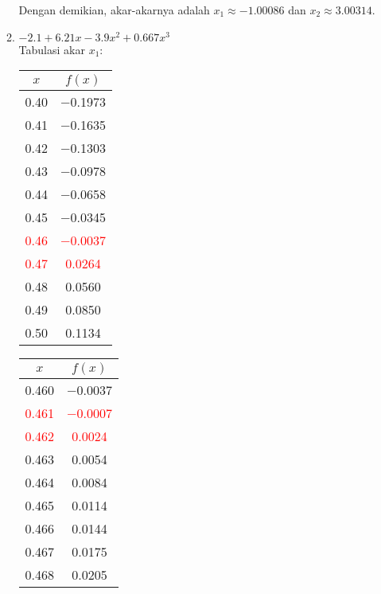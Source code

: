 \documentclass{article}
\begin{document}
\begin{enumerate}
\begin{enumerate}
            Dengan demikian, akar-akarnya adalah $x_1 \approx \num{-1,00086}$ dan $x_2 \approx \num{3,00314}$.
    
        \item $\num{-2,1} + \num{6,21}x - \num{3,9}x^2 + \num{0,667}x^3$ \\
        Tabulasi akar $x_1$: \\
        \begin{tabular}{|c|c|}
            \hline
            $x$   & $f(x)$ \\
            \hline
            \num{0,40} & \num{-0,1973} \\
            \num{0,41} & \num{-0,1635} \\
            \num{0,42} & \num{-0,1303} \\
            \num{0,43} & \num{-0,0978} \\
            \num{0,44} & \num{-0,0658} \\
            \num{0,45} & \num{-0,0345} \\
            \textcolor{red}{\num{0,46}} & \textcolor{red}{\num{-0,0037}} \\
            \textcolor{red}{\num{0,47}} & \textcolor{red}{\num{0,0264}} \\
            \num{0,48} & \num{0,0560} \\
            \num{0,49} & \num{0,0850} \\
            \num{0,50} & \num{0,1134} \\
            \hline
            \end{tabular}\quad
            \begin{tabular}{|c|c|}
            \hline
            $x$   & $f(x)$ \\
            \hline
            \num{0,460} & \num{-0,0037} \\
            \textcolor{red}{\num{0,461}} & \textcolor{red}{\num{-0,0007}} \\
            \textcolor{red}{\num{0,462}} & \textcolor{red}{\num{0,0024}} \\
            \num{0,463} & \num{0,0054} \\
            \num{0,464} & \num{0,0084} \\
            \num{0,465} & \num{0,0114} \\
            \num{0,466} & \num{0,0144} \\
            \num{0,467} & \num{0,0175} \\
            \num{0,468} & \num{0,0205} \\

\end{tabular}
\end{enumerate}
\end{enumerate}
\end{document}
